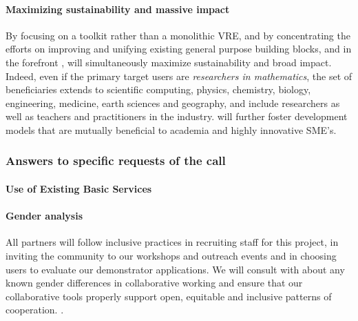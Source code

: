 
\paragraph{Maximizing sustainability and massive impact}

By focusing on a toolkit rather than a monolithic VRE, and by
concentrating the efforts on improving and unifying existing general
purpose building blocks, and in the forefront \Jupyter, \TheProject
will simultaneously maximize sustainability and broad impact. Indeed,
even if the primary target users are \emph{researchers in
  mathematics}, the set of beneficiaries extends to scientific
computing, physics, chemistry, biology, engineering, medicine, earth
sciences and geography, and include researchers as well as teachers
and practitioners in the industry. \TheProject will further foster
development models that are mutually beneficial to academia and highly
innovative SME's.


\subsubsection{Answers to specific requests of the call}

\paragraph{Use of Existing Basic Services}

\paragraph{Gender analysis}

All partners will follow inclusive practices in recruiting staff for
this project, in inviting the community to our workshops and outreach
events and in choosing users to evaluate our demonstrator
applications. We will consult with  about any known gender differences in
collaborative working and ensure that our collaborative tools properly
support open, equitable and inclusive patterns of cooperation. 
.


